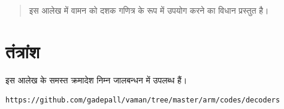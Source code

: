 \documentclass[journal,12pt,twocolumn]{IEEEtran}
\begin{document}



%

\begin{abstract}
इस आलेख में वामन को  दशक गणित्र के रूप में उपयोग करने का विधान प्रस्तुत है।


\end{abstract}

\printnomenclature[1.7in]

\section{तंत्रांश}
इस आलेख के समस्त क्रमादेश निम्न जालबन्धन में उपलब्ध हैं।
\begin{lstlisting}
https://github.com/gadepall/vaman/tree/master/arm/codes/decoders
\end{lstlisting}
%
\end{document}
